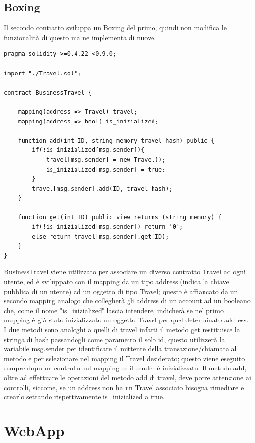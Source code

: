 \documentclass[11pt,a4paper,titlepage,twoside,openright]{report}
\begin{document}
\subsection{Boxing}
Il secondo contratto sviluppa un Boxing del primo, quindi non modifica le funzionalità di questo ma ne implementa di nuove.
\begin{lstlisting}[language=Solidity]
pragma solidity >=0.4.22 <0.9.0;

import "./Travel.sol";

contract BusinessTravel {

    mapping(address => Travel) travel;
    mapping(address => bool) is_inizialized;

    function add(int ID, string memory travel_hash) public {
        if(!is_inizialized[msg.sender]){
            travel[msg.sender] = new Travel();
            is_inizialized[msg.sender] = true;
        } 
        travel[msg.sender].add(ID, travel_hash);
    }

    function get(int ID) public view returns (string memory) {
        if(!is_inizialized[msg.sender]) return '0';
        else return travel[msg.sender].get(ID);
    }
}
\end{lstlisting}

BusinessTravel viene utilizzato per associare un diverso contratto Travel ad ogni utente, ed è sviluppato con il mapping da un tipo address (indica la chiave pubblica di un utente) ad un oggetto di tipo Travel; questo è affiancato da un secondo mapping analogo che collegherà gli address di un account ad un booleano che, come il nome "is\_inizialized" lascia intendere, indicherà se nel primo mapping è già stato inizializzato un oggetto Travel per quel determinato address. I due metodi sono analoghi a quelli di travel infatti il metodo get restituisce la stringa di hash passandogli come parametro il solo id, questo utilizzerà la variabile msg.sender per identificare il mittente della transazione/chiamata al metodo e per selezionare nel mapping il Travel desiderato; questo viene eseguito sempre dopo un controllo sul mapping se il sender è inizializzato. Il metodo add, oltre ad effettuare le operazioni del metodo add di travel, deve porre attenzione ai controlli, siccome, se un address non ha un Travel associato bisogna rimediare e crearlo settando rispettivamente is\_inizialized a true.

\section{WebApp}
\end{document}
